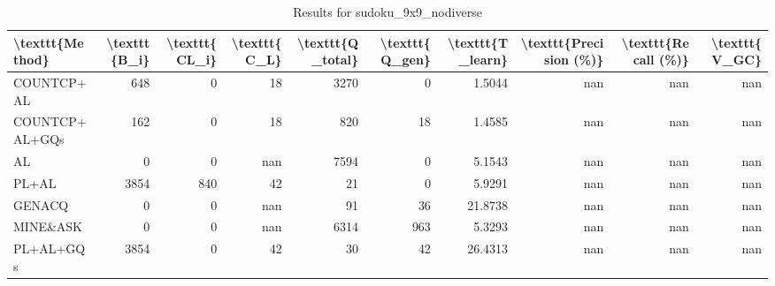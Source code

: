\begin{table}[ht]
\caption{Results for sudoku_9x9_nodiverse}
\begin{tabular}{lrrrrrrrrr}
\hline
 \textbackslash{}texttt\{Method\}   &   \textbackslash{}texttt\{B\_i\} &   \textbackslash{}texttt\{CL\_i\} &   \textbackslash{}texttt\{C\_L\} &   \textbackslash{}texttt\{Q\_total\} &   \textbackslash{}texttt\{Q\_gen\} &   \textbackslash{}texttt\{T\_learn\} &   \textbackslash{}texttt\{Precision (\%)\} &   \textbackslash{}texttt\{Recall (\%)\} &   \textbackslash{}texttt\{V\_GC\} \\
\hline
 COUNTCP+AL        &            648 &               0 &             18 &               3270 &                0 &             1.5044 &                      nan &                   nan &             nan \\
 COUNTCP+AL+GQs    &            162 &               0 &             18 &                820 &               18 &             1.4585 &                      nan &                   nan &             nan \\
 AL                &              0 &               0 &            nan &               7594 &                0 &             5.1543 &                      nan &                   nan &             nan \\
 PL+AL             &           3854 &             840 &             42 &                 21 &                0 &             5.9291 &                      nan &                   nan &             nan \\
 GENACQ            &              0 &               0 &            nan &                 91 &               36 &            21.8738 &                      nan &                   nan &             nan \\
 MINE\&ASK          &              0 &               0 &            nan &               6314 &              963 &             5.3293 &                      nan &                   nan &             nan \\
 PL+AL+GQs         &           3854 &               0 &             42 &                 30 &               42 &            26.4313 &                      nan &                   nan &             nan \\
\hline
\end{tabular}
\end{table}